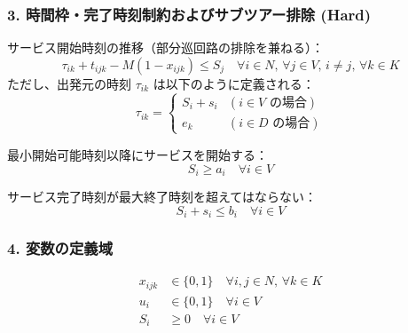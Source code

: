 \documentclass[11pt,a4paper]{article}
\begin{document}
\subsubsection{3. 時間枠・完了時刻制約およびサブツアー排除 (Hard)}
サービス開始時刻の推移（部分巡回路の排除を兼ねる）：
\begin{equation}
\tau_{ik} + t_{ijk} - M (1 - x_{ijk}) \le S_j \quad \forall i \in N, \, \forall j \in V, \, i \neq j, \, \forall k \in K
\end{equation}
ただし、出発元の時刻 $\tau_{ik}$ は以下のように定義される：
\begin{equation}
\tau_{ik} = 
\begin{cases}
S_i + s_i & (i \in V \text{ の場合}) \\
e_k & (i \in D \text{ の場合})
\end{cases}
\end{equation}

最小開始可能時刻以降にサービスを開始する：
\begin{equation}
S_i \ge a_i \quad \forall i \in V
\end{equation}

サービス完了時刻が最大終了時刻を超えてはならない：
\begin{equation}
S_i + s_i \le b_i \quad \forall i \in V
\end{equation}

\subsubsection{4. 変数の定義域}
\begin{align}
x_{ijk} &\in \{0, 1\} \quad \forall i, j \in N, \, \forall k \in K \\
u_i &\in \{0, 1\} \quad \forall i \in V \\
S_i &\ge 0 \quad \forall i \in V
\end{align}
\end{document}
